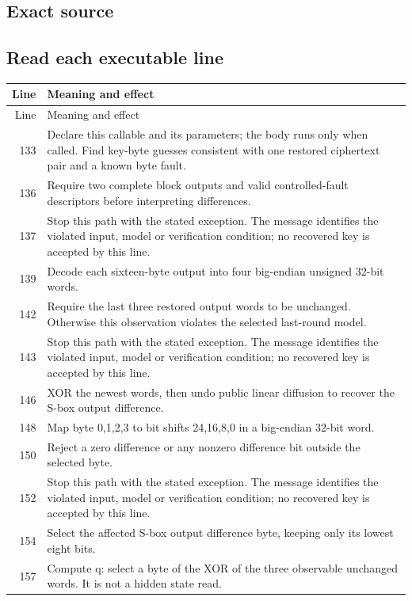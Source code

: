 \subsection*{Exact source}
\subsection*{Read each executable line}
\begingroup\small\begin{longtable}{r >{\raggedright\arraybackslash}p{138mm}}\toprule Line&Meaning and effect\\\midrule\endfirsthead\toprule Line&Meaning and effect\\\midrule\endhead
133&Declare this callable and its parameters; the body runs only when called. Find key-byte guesses consistent with one restored ciphertext pair and a known byte fault.\\
136&Require two complete block outputs and valid controlled-fault descriptors before interpreting differences.\\
137&Stop this path with the stated exception. The message identifies the violated input, model or verification condition; no recovered key is accepted by this line.\\
139&Decode each sixteen-byte output into four big-endian unsigned 32-bit words.\\
142&Require the last three restored output words to be unchanged. Otherwise this observation violates the selected last-round model.\\
143&Stop this path with the stated exception. The message identifies the violated input, model or verification condition; no recovered key is accepted by this line.\\
146&XOR the newest words, then undo public linear diffusion to recover the S-box output difference.\\
148&Map byte 0,1,2,3 to bit shifts 24,16,8,0 in a big-endian 32-bit word.\\
150&Reject a zero difference or any nonzero difference bit outside the selected byte.\\
152&Stop this path with the stated exception. The message identifies the violated input, model or verification condition; no recovered key is accepted by this line.\\
154&Select the affected S-box output difference byte, keeping only its lowest eight bits.\\
157&Compute q: select a byte of the XOR of the three observable unchanged words. It is not a hidden state read.\\

\end{longtable}
